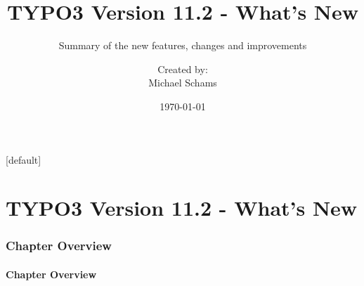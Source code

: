 \documentclass[t]{beamer}
\title{TYPO3 Version 11.2 - What's New}
\subtitle{Summary of the new features, changes and improvements}
\author{
	\centerline{Created by:}
	\centerline{Michael Schams}
}
\date{\today}
\begin{document}
\sharefont


\begingroup
	[default]
	\begin{frame}
		\titlepage
	\end{frame}
\endgroup


\section*{TYPO3 Version 11.2 - What's New}
\begin{frame}[fragile]
	\frametitle{Chapter Overview}
	\framesubtitle{Chapter Overview}

	\tableofcontents

\end{frame}















\end{document}
